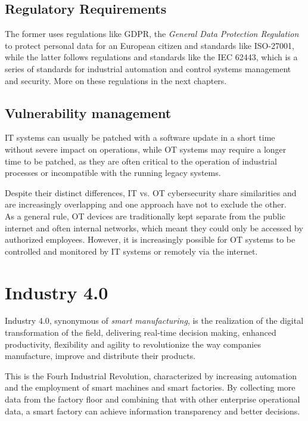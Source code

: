 \subsection{Regulatory Requirements}

The former uses regulations like GDPR, the \textit{General Data Protection Regulation} to protect personal data for an European citizen and standards like ISO-27001, while the latter follows regulations and standards like the IEC 62443, which is a series of standards for industrial automation and control systems management and security. More on these regulations in the next chapters.

\subsection{Vulnerability management}

IT systems can usually be patched with a software update in a short time without severe impact on operations, while OT systems may require a longer time to be patched, as they are often critical to the operation of industrial processes or incompatible with the running legacy systems.


Despite their distinct differences, IT vs. OT cybersecurity share similarities and are increasingly overlapping and one approach have not to exclude the other.\\
As a general rule, OT devices are traditionally kept separate from the public internet and often internal networks, which meant they could only be accessed by authorized employees. However, it is increasingly possible for OT systems to be controlled and monitored by IT systems or remotely via the internet.~\cite{it-vs-ot-cybersecurity}

\section{Industry 4.0}

Industry 4.0, synonymous of \textit{smart manufacturing}, is the realization of the digital transformation of the field, delivering real-time decision making, enhanced productivity, flexibility and agility to revolutionize the way companies manufacture, improve and distribute their products.  

This is the Fourh Industrial Revolution, characterized by increasing automation and the employment of smart machines and smart factories. By collecting more data from the factory floor and combining that with other enterprise operational data, a smart factory can achieve information transparency and better decisions.

